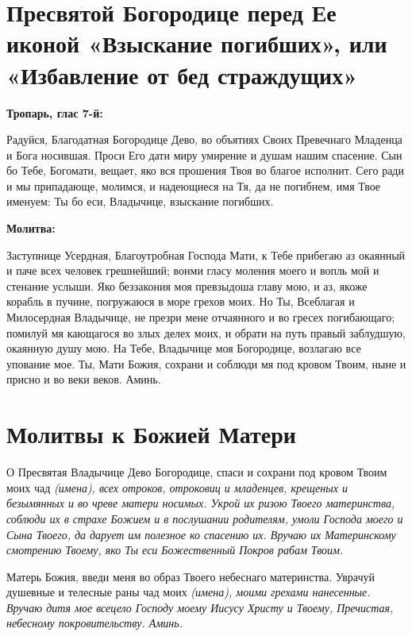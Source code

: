 \newpage\section{Пресвятой Богородице перед Ее иконой «Взыскание погибших», или «Избавление от бед страждущих»}
 
\bfseries Тропарь, глас 7-й:\normalfont{}


Радуйся, Благодатная Богородице Дево, во объятиях Своих Превечнаго Младенца и Бога носившая. Проси Его дати миру умирение и душам нашим спасение. Сын бо Тебе, Богомати, вещает, яко вся прошения Твоя во благое исполнит. Сего ради и мы припадающе, молимся, и надеющиеся на Тя, да не погибнем, имя Твое именуем: Ты бо еси, Владычице, взыскание погибших.


\medskip
\bfseries Молитва:\normalfont{}\nopagebreak


Заступнице Усердная, Благоутробная Господа Мати, к Тебе прибегаю аз окаянный и паче всех человек грешнейший; вонми гласу моления моего и вопль мой и стенание услыши. Яко беззакония моя превзыдоша главу мою, и аз, якоже корабль в пучине, погружаюся в море грехов моих. Но Ты, Всеблагая и Милосердная Владычице, не презри мене отчаянного и во гресех погибающаго; помилуй мя кающагося во злых делех моих, и обрати на путь правый заблудшую, окаянную душу мою. На Тебе, Владычице моя Богородице, возлагаю все упование мое. Ты, Мати Божия, сохрани и соблюди мя под кровом Твоим, ныне и присно и во веки веков. Аминь.

\section{Молитвы к Божией Матери}
 

О Пресвятая Владычице Дево Богородице, спаси и сохрани под кровом Твоим моих чад \itshape (имена)\normalfont{}, всех отроков, отроковиц и младенцев, крещеных и безымянных и во чреве матери носимых. Укрой их ризою Твоего материнства, соблюди их в страхе Божием и в послушании родителям, умоли Господа моего и Сына Твоего, да дарует им полезное ко спасению их. Вручаю их Материнскому смотрению Твоему, яко Ты еси Божественный Покров рабам Твоим.

Матерь Божия, введи меня во образ Твоего небеснаго материнства. Уврачуй душевные и телесные раны чад моих \itshape (имена)\normalfont{}, моими грехами нанесенные. Вручаю дитя мое всецело Господу моему Иисусу Христу и Твоему, Пречистая, небесному покровительству. Аминь.

